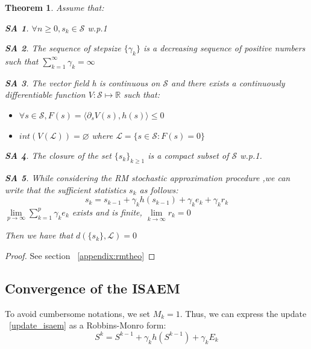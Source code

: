 \documentclass[a4paper]{article}
\theoremstyle{plain}
\newtheorem{assumption_rm}{SA}
\theoremstyle{plain}
\newtheorem{thm}{Theorem}
\theoremstyle{definition}
\begin{document}
\begin{thm}\label{rmtheo}
Assume that:
\begin{assumption_rm}
$\forall n \geq 0, s_k \in \mathcal{S}$ w.p.1
\end{assumption_rm}

\begin{assumption_rm}
The sequence of stepsize $\{\gamma_k\}$ is a decreasing sequence of positive numbers such that $\sum_{k=1}^{\infty}{\gamma_k} = \infty$
\end{assumption_rm}

\begin{assumption_rm}\label{assumption:lyapunov}
The vector field h is continuous on $\mathcal{S}$ and there exists a continuously differentiable function $V: \mathcal{S} \mapsto \mathbb{R}$ such that:
\begin{itemize}
  \item $\forall s \in \mathcal{S}, F(s) = \langle \partial_{s}V(s), h(s) \rangle \leq 0$
  \item $int(V(\mathcal{L})) = \varnothing $ where $ \mathcal{L} = \{s \in \mathcal{S}: F(s) = 0\}$
\end{itemize}
\end{assumption_rm}

\begin{assumption_rm}
The closure of the set $\{s_k\}_{k \geq 1}$ is a compact subset of $\mathcal{S}$ w.p.1.
\end{assumption_rm}

\begin{assumption_rm}
While considering the RM stochastic approximation procedure ,we can write that the sufficient statistics $s_k$ as follows:
\begin{equation}
s_k = s_{k-1} + \gamma_k h(s_{k-1}) + \gamma_k e_k + \gamma_k r_k
\end{equation}
$\lim \limits_{p \to \infty} \sum_{k=1}^{p}{\gamma_k e_k}$ exists and is finite, $\lim \limits_{k \to \infty} r_k = 0$
\end{assumption_rm}
Then we have that $d(\{s_k\},\mathcal{L}) = 0$
\end{thm}

\begin{proof}
See section ~\ref{appendix:rmtheo}
\end{proof}

\subsection{Convergence of the ISAEM}
To avoid cumbersome notations, we set $M_k = 1$. Thus, we can express the update ~\ref{update_isaem} as a Robbins-Monro form:
\begin{equation}
S^{k}= S^{k-1} + \gamma_k h(S^{k-1}) + \gamma_k E_k
\end{equation}
\end{document}
